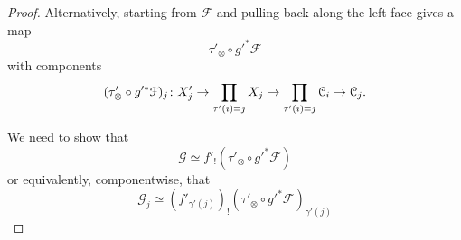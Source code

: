 \documentclass[main.tex]{subfiles}
\begin{document}
\begin{proof}
  Alternatively, starting from $\mathcal{F}$ and pulling back along the left face gives a map
  \begin{equation*}
    \tau'_{\otimes} \circ g'^{*}\mathcal{F}
  \end{equation*}
  with components
  \begin{equation*}
    (\tau'_{\otimes} \circ g'^{*}\mathcal{F})_{j}\colon X'_{j} \to \prod_{\tau'(i) = j} X_{j} \to \prod_{\tau'(i) = j} \mathcal{C}_{i} \to \mathcal{C}_{j}.
  \end{equation*}
   
  We need to show that
  \begin{equation*}
    \mathcal{G} \simeq f'_{!}(\tau'_{\otimes} \circ g'^{*}\mathcal{F})
  \end{equation*}
  or equivalently, componentwise, that
  \begin{equation*}
    \mathcal{G}_{j} \simeq (f'_{\gamma'(j)})_{!}(\tau'_{\otimes} \circ g'^{*}\mathcal{F})_{\gamma'(j)}
  \end{equation*}
\end{proof}
\end{document}
